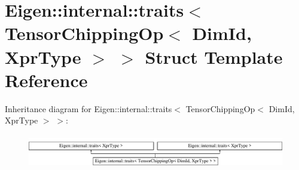 \hypertarget{struct_eigen_1_1internal_1_1traits_3_01_tensor_chipping_op_3_01_dim_id_00_01_xpr_type_01_4_01_4}{}\section{Eigen\+:\+:internal\+:\+:traits$<$ Tensor\+Chipping\+Op$<$ Dim\+Id, Xpr\+Type $>$ $>$ Struct Template Reference}
\label{struct_eigen_1_1internal_1_1traits_3_01_tensor_chipping_op_3_01_dim_id_00_01_xpr_type_01_4_01_4}
Inheritance diagram for Eigen\+:\+:internal\+:\+:traits$<$ Tensor\+Chipping\+Op$<$ Dim\+Id, Xpr\+Type $>$ $>$\+:\begin{figure}[H]
\begin{center}
\leavevmode
\includegraphics[height=1.489362cm]{struct_eigen_1_1internal_1_1traits_3_01_tensor_chipping_op_3_01_dim_id_00_01_xpr_type_01_4_01_4}
\end{center}
\end{figure}
